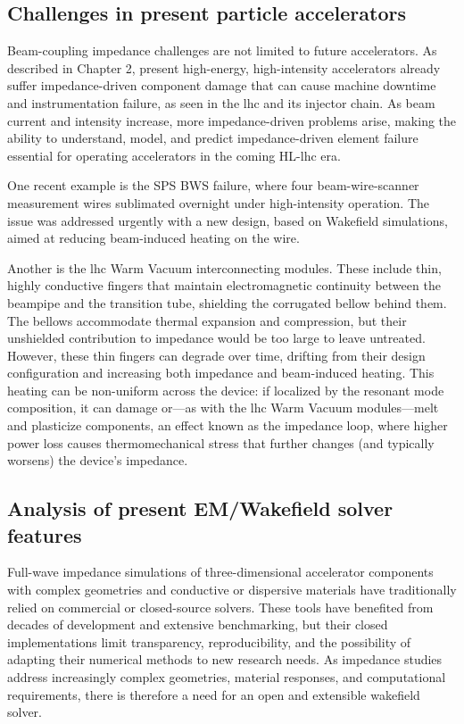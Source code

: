 \subsection{Challenges in present particle accelerators}

Beam-coupling impedance challenges are not limited to future accelerators. As described in Chapter 2, present high-energy, high-intensity accelerators already suffer impedance-driven component damage that can cause machine downtime and instrumentation failure, as seen in the
\gls{lhc} and its injector chain. As beam current and intensity increase, more impedance-driven problems arise, making the ability to understand,
model, and predict impedance-driven element failure essential for operating accelerators in the coming HL-\gls{lhc} era.

One recent example is the SPS BWS failure, where four beam-wire-scanner measurement wires sublimated overnight under high-intensity operation. The issue was addressed urgently with a new design, based on Wakefield simulations, aimed at reducing beam-induced heating on the wire.

Another is the \gls{lhc} Warm Vacuum interconnecting modules. These include thin, highly conductive fingers that maintain electromagnetic continuity between the beampipe and the transition tube, shielding the corrugated bellow behind them. The bellows accommodate thermal expansion and compression, but their unshielded contribution to impedance would be too large to leave untreated. However, these thin fingers can degrade over time, drifting from their design configuration and increasing both impedance and beam-induced heating. This heating can be non-uniform across the device: if localized by the resonant mode composition, it can damage or---as with the \gls{lhc} Warm Vacuum modules---melt and plasticize components, an effect known as the impedance loop, where higher power loss causes thermomechanical stress that further changes (and typically worsens) the device's impedance.

\subsection{Analysis of present EM/Wakefield solver features}
\label{sec:wakefield_solver_requirements}

Full-wave impedance simulations of three-dimensional accelerator components with complex geometries and conductive or dispersive materials have traditionally relied on commercial or closed-source solvers. These tools have benefited from decades of development and extensive benchmarking, but their closed implementations limit transparency, reproducibility, and the possibility of adapting their numerical methods to new research needs. As impedance studies address increasingly complex geometries, material responses, and computational requirements, there is therefore a need for an open and extensible wakefield solver.


